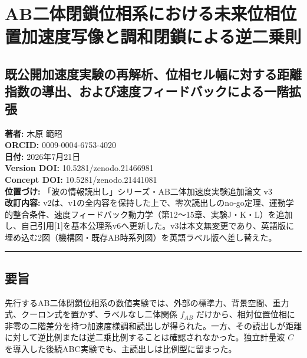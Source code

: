 \documentclass[
  a4paper,
]{ltjsarticle}
\author{}
\date{}
\begin{document}
\section{AB二体閉鎖位相系における未来位相位置加速度写像と調和閉鎖による逆二乗則}\label{abux4e8cux4f53ux9589ux9396ux4f4dux76f8ux7cfbux306bux304aux3051ux308bux672aux6765ux4f4dux76f8ux4f4dux7f6eux52a0ux901fux5ea6ux5199ux50cfux3068ux8abfux548cux9589ux9396ux306bux3088ux308bux9006ux4e8cux4e57ux5247}

\subsection{既公開加速度実験の再解析、位相セル幅に対する距離指数の導出、および速度フィードバックによる一階拡張}\label{ux65e2ux516cux958bux52a0ux901fux5ea6ux5b9fux9a13ux306eux518dux89e3ux6790ux4f4dux76f8ux30bbux30ebux5e45ux306bux5bfeux3059ux308bux8dddux96e2ux6307ux6570ux306eux5c0eux51faux304aux3088ux3073ux901fux5ea6ux30d5ux30a3ux30fcux30c9ux30d0ux30c3ux30afux306bux3088ux308bux4e00ux968eux62e1ux5f35}

\textbf{著者:} 木原 範昭\\
\textbf{ORCID:} 0009-0004-6753-4020\\
\textbf{日付:} 2026年7月21日\\
\textbf{Version DOI:} 10.5281/zenodo.21466981\\
\textbf{Concept DOI:} 10.5281/zenodo.21441081\\
\textbf{位置づけ:} 「波の情報読出し」シリーズ・AB二体加速度実験追加論文
v3\\
\textbf{改訂内容:}
v2は、v1の全内容を保持した上で、零次読出しのno-go定理、運動学的整合条件、速度フィードバック動力学（第12〜15章、実験J・K・L）を追加し、自己引用{[}1{]}を基本公理系v6へ更新した。v3は本文無変更であり、英語版に埋め込む2図（機構図・既存AB時系列図）を英語ラベル版へ差し替えた。

\begin{center}\rule{0.5\linewidth}{0.5pt}\end{center}

\subsection{要旨}\label{ux8981ux65e8}

先行するAB二体閉鎖位相系の数値実験では、外部の標準力、背景空間、重力式、クーロン式を置かず、ラベルなし二体関係
\(f_{AB}\)
だけから、相対位置位相に非零の二階差分を持つ加速度様調和読出しが得られた。一方、その読出しが距離に対して逆比例または逆二乗比例することは確認されなかった。独立計量波
\(C\) を導入した後続ABC実験でも、主読出しは比例型に留まった。
\end{document}
